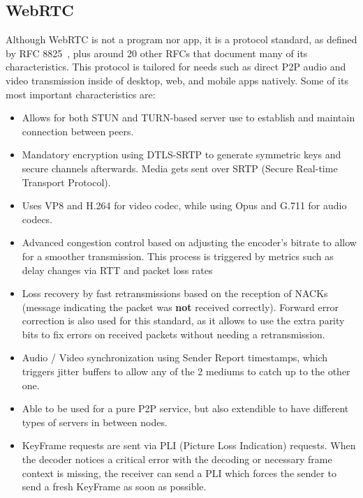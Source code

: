 \documentclass{article}
\begin{document}
    \subsection{WebRTC}
    Although WebRTC is not a program nor app, it is a protocol standard, as defined by RFC 8825~\cite{rfc8825}, plus around 20 other RFCs that document many of its characteristics. This protocol is tailored for needs such as direct P2P audio and video transmission inside of desktop, web, and mobile apps natively. Some of its most important 
    characteristics are:
    \begin{itemize}
        \item Allows for both STUN and TURN-based server use to establish and maintain connection between peers.
        \item Mandatory encryption using DTLS-SRTP to generate symmetric keys and secure channels afterwards. Media gets sent over SRTP (Secure Real-time Transport Protocol).
        \item Uses VP8 and H.264 for video codec, while using Opus and G.711 for audio codecs.
        \item Advanced congestion control based on adjusting the encoder's bitrate to allow for a smoother transmission. This process is triggered by metrics such as delay changes via RTT and packet loss rates
        \item Loss recovery by fast retransmissions based on the reception of NACKs (message indicating the packet was \textbf{not} received correctly). Forward error correction is also used for this standard, as it allows to use the extra parity bits to fix errors on received packets without needing a retransmission.
        \item Audio / Video synchronization using Sender Report timestamps, which triggers jitter buffers to allow any of the 2 mediums to catch up to the other one.
        \item Able to be used for a pure P2P service, but also extendible to have different types of servers in between nodes.
        \item KeyFrame requests are sent via PLI (Picture Loss Indication) requests. When the decoder notices a critical error with the decoding or necessary frame context is missing, the receiver can send a PLI which forces the sender to send a fresh KeyFrame as soon as possible.
    \end{itemize}
\end{document}
